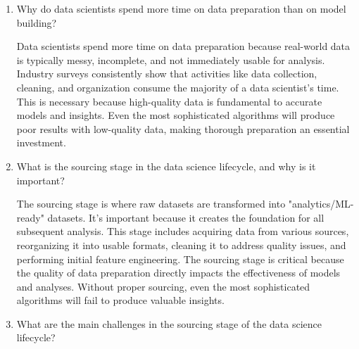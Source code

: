 \documentclass[12pt]{article}
\begin{document}
\begin{enumerate}
    \item Why do data scientists spend more time on data preparation than on model building?
    
    \begin{tcolorbox}[colback=blue!5!white,colframe=blue!75!black,title={Solution}]
    Data scientists spend more time on data preparation because real-world data is typically messy, incomplete, and not immediately usable for analysis. Industry surveys consistently show that activities like data collection, cleaning, and organization consume the majority of a data scientist's time. This is necessary because high-quality data is fundamental to accurate models and insights. Even the most sophisticated algorithms will produce poor results with low-quality data, making thorough preparation an essential investment.
    \end{tcolorbox}
    
    \item What is the sourcing stage in the data science lifecycle, and why is it important?
    
    \begin{tcolorbox}[colback=blue!5!white,colframe=blue!75!black,title={Solution}]
    The sourcing stage is where raw datasets are transformed into "analytics/ML-ready" datasets. It's important because it creates the foundation for all subsequent analysis. This stage includes acquiring data from various sources, reorganizing it into usable formats, cleaning it to address quality issues, and performing initial feature engineering. The sourcing stage is critical because the quality of data preparation directly impacts the effectiveness of models and analyses. Without proper sourcing, even the most sophisticated algorithms will fail to produce valuable insights.
    \end{tcolorbox}
    
    \item What are the main challenges in the sourcing stage of the data science lifecycle?
    

\end{enumerate}
\end{document}
